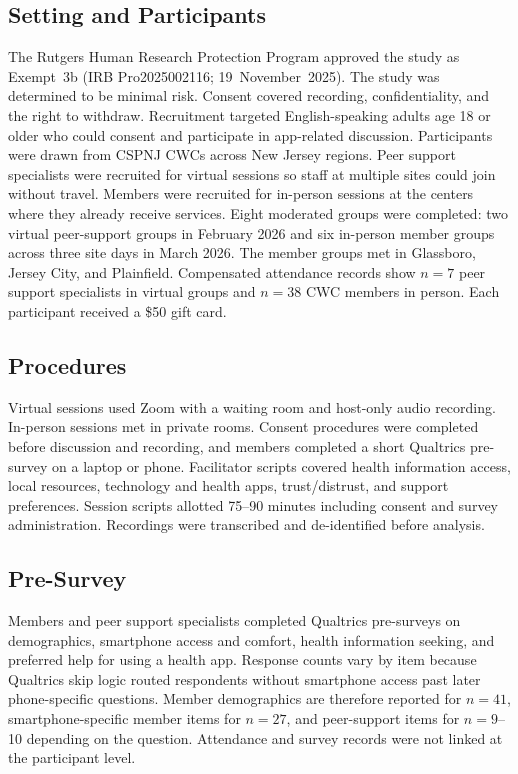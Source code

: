 \documentclass[conference,a4paper]{IEEEtran}
\begin{document}
\subsection{Setting and Participants}
The Rutgers Human Research Protection Program approved the study as Exempt~3b
(IRB Pro2025002116; 19~November~2025). The study was determined to be minimal
risk. Consent covered recording, confidentiality, and the right to withdraw.
Recruitment targeted English-speaking adults age 18 or older who could consent
and participate in app-related discussion. Participants were drawn from CSPNJ
CWCs across New Jersey regions.
Peer support specialists were recruited for virtual sessions so staff at multiple
sites could join without travel. Members were recruited for in-person sessions at
the centers where they already receive services. Eight moderated groups were
completed: two virtual peer-support groups in February 2026 and six in-person
member groups across three site days in March 2026. The member groups met in
Glassboro, Jersey City, and Plainfield.
Compensated attendance records show $n{=}7$ peer support specialists in virtual
groups and $n{=}38$ CWC members in person. Each participant received a \$50 gift
card.

\subsection{Procedures}
Virtual sessions used Zoom with a waiting room and host-only audio recording.
In-person sessions met in private rooms. Consent procedures were completed before
discussion and recording, and members completed a short Qualtrics pre-survey on
a laptop or phone. Facilitator scripts covered health information
access, local resources, technology and health apps, trust/distrust, and support
preferences. Session scripts allotted 75--90 minutes including consent and survey
administration. Recordings were
transcribed and de-identified before analysis.

\subsection{Pre-Survey}
Members and peer support specialists completed Qualtrics pre-surveys on
demographics, smartphone access and comfort, health information seeking, and
preferred help for using a health app. Response counts vary by item because
Qualtrics skip logic routed respondents without smartphone access past later
phone-specific questions. Member demographics are therefore reported for
$n{=}41$, smartphone-specific member items for $n{=}27$, and peer-support items
for $n{=}9$--10 depending on the question. Attendance and survey records were not
linked at the participant level.
\end{document}
